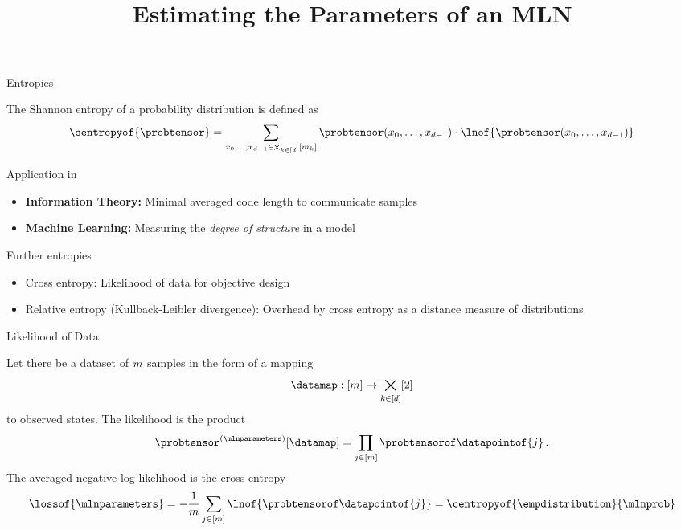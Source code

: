 \documentclass{beamer}
\title[Parameter Estimation]{
	\coursechapterthree \\
	{\huge Estimating the Parameters of an MLN}
}
\begin{document}
{\frame[plain]{\titlepage}}





\begin{frame}{Entropies}

\begin{definition}
	The Shannon entropy of a probability distribution is defined as 
		\[ \sentropyof{\probtensor} %
		= \sum_{\catindices\in\facstates} \probtensor(\catindices) \cdot \lnof{\probtensor(\catindices)} \]
\end{definition}

Application in
\begin{itemize}
	\item \textbf{Information Theory:} Minimal averaged code length to communicate samples
	\item \textbf{Machine Learning:} Measuring the \emph{degree of structure} in a model
\end{itemize}

Further entropies
\begin{itemize}
	\item Cross entropy: Likelihood of data for objective design
	\item Relative entropy (Kullback-Leibler divergence): Overhead by cross entropy as a distance measure of distributions
\end{itemize}

\end{frame}

\begin{frame}{Likelihood of Data}

Let there be a dataset of $m$ samples in the form of a mapping
		\[ \datamap : [\datanum] \rightarrow \atomstates \]
to observed states.
\medskip
The likelihood is the product 
\begin{align*}
	\probtensor^{(\mlnparameters)}[\datamap] = \prod_{\datindexin} \mlnprobabilityof{\datapointof{\datindex}} \, .
\end{align*}
\medskip
The averaged negative log-likelihood is the cross entropy
\begin{align*}
	 \lossof{\mlnparameters} = -\frac{1}{\datanum}\sum_{\datindexin} \lnof{\mlnprobabilityof{\datapointof{\datindex}} } =  \centropyof{\empdistribution}{\mlnprob}
\end{align*}

\end{frame}
\end{document}
